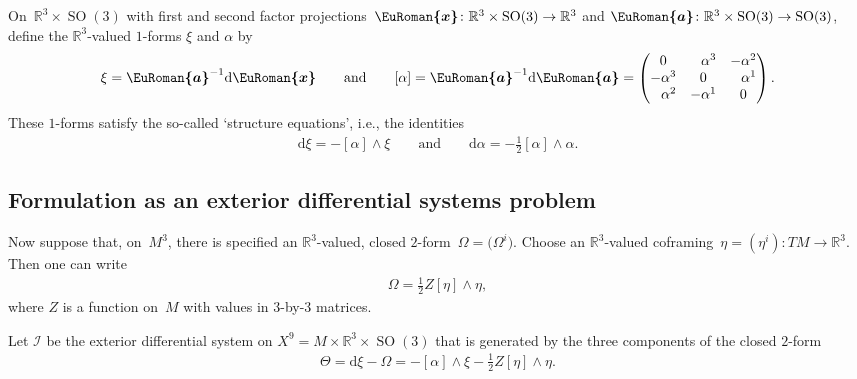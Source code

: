 \documentclass[11pt]{article}
\numberwithin{equation}{section}
\newcommand{\eurom}{\EuRoman}
\renewcommand{\d}{\mathrm{d}}%
\newcommand{\cI}{{\mathcal I}}
\newcommand{\bbR}{{\mathbb R}}
\newcommand{\SO}{\operatorname{SO}}
\newcommand{\euroa}{\bm{\eurom{a}}}
\newcommand{\eurox}{\bm{\eurom{x}}}
\newcommand{\phm}{\phantom{-}}
\begin{document}
On~$\bbR^3\times\SO(3)$ with first and second factor projections~$\eurox\colon \bbR^3\times\SO(3)\to\bbR^3$ and $\euroa\colon \bbR^3\times\SO(3)\to\SO(3)$,
define the $\mathbb{R}^3$-valued $1$-forms $\xi$ and $\alpha$ by
\begin{gather} \label{basis-forms-on-R3xSO3}
\xi = \euroa^{-1} \d \eurox
\qquad\text{and}\qquad
[\alpha] = \euroa^{-1} \d \euroa = \begin{pmatrix}
0 & \phm\alpha^3 & -\alpha^2\\
-\alpha^3 & 0 & \phm\alpha^1\\
\phm\alpha^2 & -\alpha^1 & 0
\end{pmatrix}.
\end{gather}
These $1$-forms satisfy the so-called `structure equations', i.e., the identities
\begin{gather} \label{structure-eqs-on-R3xSO3}
\d\xi = -[\alpha]\wedge\xi
\qquad\text{and}\qquad
\d\alpha = -\tfrac12 [\alpha]\wedge\alpha.
\end{gather}

\subsection{Formulation as an exterior differential systems problem}
Now suppose that, on~$M^3$, there is specified an $\mathbb{R}^3$-valued, closed $2$-form~$\Omega=\big(\Omega^i\big)$. Choose an $\mathbb{R}^3$-valued coframing~$\eta = (\eta^i)\colon TM\to\bbR^3$.
Then one can write
\begin{gather*}
\Omega = \tfrac12 Z [\eta]\wedge\eta ,
\end{gather*}
where $Z$ is a function on~$M$ with values in $3$-by-$3$ matrices.

Let $\cI$ be the exterior differential system on $X^9 = M\times\mathbb{R}^3\times\SO(3)$ that is generated by the three components of the closed $2$-form
\begin{gather*}%
\Theta = \d\xi - \Omega = -[\alpha]\wedge\xi - \tfrac12 Z [\eta]\wedge\eta.
\end{gather*}
\end{document}
